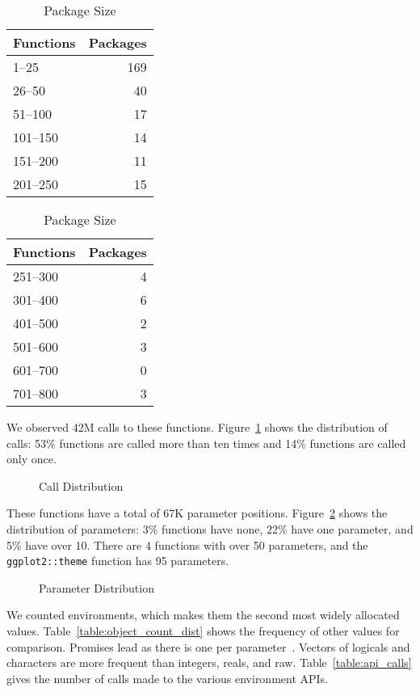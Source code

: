\documentclass[10pt,review,sigplan,authorversion=true]{acmart}
\begin{document}
\begin{table}[!h]  \vspace{-2mm}  \small
  \caption{Package Size} \label{table:packsize}  \centering
  \begin{tabular}{lr}    \toprule
    \bf Functions&\bf Packages\\    \midrule
    1--25&169\\
    26--50&40\\
    51--100&17\\
    101--150&14\\
    151--200&11\\
    201--250&15\\    \bottomrule
  \end{tabular}
  \quad
  \begin{tabular}{lr}    \toprule
    \bf Functions&\bf Packages\\    \midrule
    251--300&4\\
    301--400&6\\
    401--500&2\\
    501--600&3\\
    601--700&0\\
    701--800&3\\    \bottomrule
  \end{tabular}
\end{table}

\noindent
We observed 42M calls to these functions. Figure~\ref{fig:calldist} shows the
distribution of calls: 53\% functions are called more than ten times and 14\%
functions are called only once.

\begin{figure}[!h]
  \centering
  
  \caption{Call Distribution}
  \label{fig:calldist}
\end{figure}

\noindent
These functions have a total of 67K parameter positions.
Figure~\ref{fig:paramdist} shows the distribution of parameters: 3\% functions
have none, 22\% have one parameter, and 5\% have over 10. There are 4 functions
with over 50 parameters, and the \texttt{ggplot2::theme} function has 95
parameters.

\begin{figure}[!h]  \centering
  
  \caption{Parameter Distribution}
  \label{fig:paramdist}
\end{figure}

We counted \ObjCntEnvironment environments, which makes them the second most
widely allocated values. Table~\ref{table:object_count_dist} shows the frequency
of other values for comparison. Promises lead as there is one per
parameter~\cite{oopsla19b}. Vectors of logicals and characters are more frequent
than integers, reals, and raw.
Table~\ref{table:api_calls} gives the number of calls made to the various
environment APIs.
\end{document}
